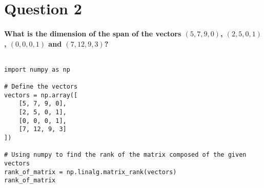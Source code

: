 \documentclass[11pt]{article} %
\begin{document}
\section{Question 2}
\paragraph{What is the dimension of the span of the vectors $(5,7,9,0)$, $(2,5,0,1)$, $(0,0,0,1)$ and $(7,12,9,3)$?}
% 
% 
% 
% 
$$$$
% 
% 
% 
\begin{lstlisting}[style=pystyle]
import numpy as np

# Define the vectors
vectors = np.array([
    [5, 7, 9, 0],
    [2, 5, 0, 1],
    [0, 0, 0, 1],
    [7, 12, 9, 3]
])

# Using numpy to find the rank of the matrix composed of the given vectors
rank_of_matrix = np.linalg.matrix_rank(vectors)
rank_of_matrix
\end{lstlisting}
% 
% 
% 
% 
\end{document}
